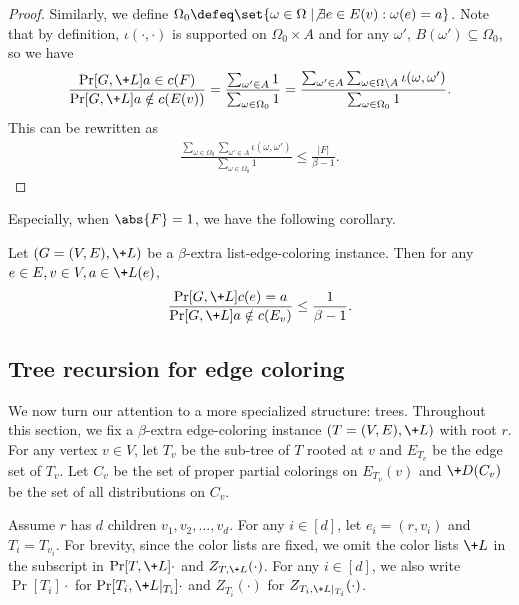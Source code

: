 \documentclass[a4paper,11pt]{article}
\begin{document}
\begin{proof}
Similarly, we define $\Omega_0\defeq\set{\omega\in \Omega \mid \not\exists e\in E(v) : \omega(e) = a}$.
Note that by definition, $\iota(\cdot, \cdot)$ is supported on $\Omega_0\times A$ and for any $\omega'$, $B(\omega')\subseteq \Omega_0$, so we have
\begin{align*}
\frac{\Pr[G,\+L]{a\in c(F)}}{\Pr[G,\+L]{a\notin c(E(v))}}
= \frac{\sum_{\omega'\in A}1}{\sum_{\omega\in \Omega_0} 1}
= \frac{\sum_{\omega'\in A}\sum_{\omega\in \Omega\setminus A} \iota(\omega, \omega')}
        {\sum_{\omega\in \Omega_0} 1 }.
\end{align*}
This can be rewritten as
\begin{align*}
\frac{\sum_{\omega\in \Omega_0} \sum_{\omega'\in A} \iota(\omega, \omega')}
        {\sum_{\omega\in \Omega_0} 1}
\le \frac{|F|}{\beta-1}.
\end{align*}
\qedhere
\end{proof}

Especially, when $\abs{F}=1$, we have the following corollary.
\begin{corollary}\label{cor:marginal-bound-gamma-delta}
    Let $(G=(V, E), \+L)$ be a $\beta$-extra list-edge-coloring instance. Then for any $e\in E, v\in V, a\in \+L(e)$, 
    \[
    \frac{\Pr[G,\+L]{c(e)=a}}{\Pr[G,\+L]{a\notin c(E_v)}} \le \frac{1}{\beta-1}.
    \]
\end{corollary}

\subsection{Tree recursion for edge coloring}\label{sec:recursion}
We now turn our attention to a more specialized structure: trees. Throughout this section, we fix a $\beta$-extra edge-coloring instance $(T=(V,E),\+{L})$ with root $r$. For any vertex $v \in V$, let $T_v$ be the sub-tree of $T$ rooted at $v$ and $E_{T_v}$ be the edge set of $T_v$. Let $C_v$ be the set of proper partial colorings on $E_{T_v}(v)$ and $\+D(C_v)$ be the set of all distributions on $C_v$. 

Assume $r$ has $d$ children $v_1, v_2, \dots, v_d$. For any $i\in [d]$, let $e_i = (r, v_i)$ and $T_i = T_{v_i}$. For brevity, since the color lists are fixed, we omit the color lists $\+L$ in the subscript in $\Pr[T,\+L]{\cdot}$ and $Z_{T,\+L}(\cdot)$. For any $i\in [d]$, we also write $\Pr[T_i]{\cdot}$ for $\Pr[T_i, \+L|_{T_i}]{\cdot}$ and $Z_{T_i}(\cdot)$ for $Z_{T_i,\+L|_{T_i}}(\cdot)$.
\end{document}

